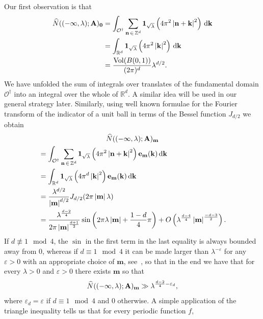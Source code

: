 \documentclass[AHL,Unicode,longabstracts,published]{cedram}
\newcommand{\de}{\, \mathrm{d}}
\newcommand{\R}{\mathbb R}
\newcommand{\Z}{\mathbb Z}
\newcommand{\CO}{\mathcal{O}}
\newcommand{\bone}{\boldsymbol 1}
\newcommand{\BA}{\mathbf A}
\newcommand{\be}{\mathbf e}
\newcommand{\bk}{\mathbf k}
\newcommand{\bm}{\mathbf m}
\newcommand{\bn}{\mathbf n}
\newcommand{\eps}{\varepsilon}
\newcommand{\bigo}[1]{O\left(#1 \right)}
\newcommand{\abs}[1]{\left\lvert #1 \right\rvert}
\let\oldhat\hat
\renewcommand*{\hat}[1]{\mathchoice{\widehat{#1}}{\widehat{#1}}{\oldhat{#1}}{\oldhat{#1}}}
\begin{document}
\begin{exem}
Our first observation is that
\begin{equation}
\begin{aligned}
\hat N((-\infty,\lambda);\BA)_{\boldsymbol 0} &=
\int_{\CO^\dagger}\sum_{\bn\,\in\,\Z^d} \bone_{\sqrt{\lambda}} \left(4
\pi^2\abs{\bn + \bk}^2 \right) \de \bk \\
&= \int_{\R^d} \bone_{\sqrt\lambda}\left(4\pi^2 \abs \bk^2 \right)
\de \bk \\
&= \frac{\operatorname{Vol}(B(0,1))}{(2\pi)^d}\lambda^{d/2}.
\end{aligned}
\end{equation}
We have unfolded the sum of integrals over translates of the fundamental domain $\CO^\dagger$ into an integral over the whole of $\R^d$. A similar idea will be used in our general strategy later. Similarly, using well known formulae for the Fourier transform of the indicator of a unit ball in terms of the Bessel function $J_{d/2}$ we obtain
\begin{multline}
\hat N((-\infty,\lambda);\BA)_{\bm}\\
\begin{aligned}
&=\int_{\CO^\dagger}\sum_{\bn\,\in\,\Z^d} \bone_{\sqrt{\lambda}} \left(4
\pi^2\abs{\bn + \bk}^2 \right) \be_\bm(\bk) \de \bk \\
&= \int_{\R^d} \bone_{\sqrt \lambda} \left(4\pi^d \abs \bk^2 \right)
\be_\bm(\bk) \de \bk \\
&= \frac{\lambda^{d/2}}{\abs \bm^{d/2}} J_{d/2}(2 \pi \abs \bm
\lambda) \\
&= \frac{\lambda^{\frac{d-2}{4}}}{2 \pi \abs \bm^{\frac{d+1}{2}} }\sin\left(2 \pi
\lambda \abs \bm + \frac{1-d}{4} \pi\right) +
\bigo{\lambda^{\frac{d-4}{4}} \abs \bm^{\frac{-d-3}{2}}}.
\end{aligned}
\end{multline}
If $d \not \equiv 1 \mod 4$, the $\sin$ in the first term in the last equality is always bounded away from $0$, whereas if $d \equiv 1 \mod 4$ it can be made larger than $\lambda^{- \eps}$ for any $\eps > 0$ with an appropriate choice of $\bm$, see~\cite{ParSob2001}, so that in the end we have that for every $\lambda > 0$ and $\eps > 0$ there exists $\bm$ so that
\begin{equation}
\hat N((-\infty,\lambda);\BA)_\bm \gg \lambda^{\frac{d-2}{4} - \eps_d},
\end{equation}
where $\eps_d = \eps$ if $d \equiv1 \mod 4$ and $0$ otherwise. A simple application of the triangle inequality tells us that for every periodic function $f$,
\begin{equation}

\end{equation}
\end{exem}
\end{document}

